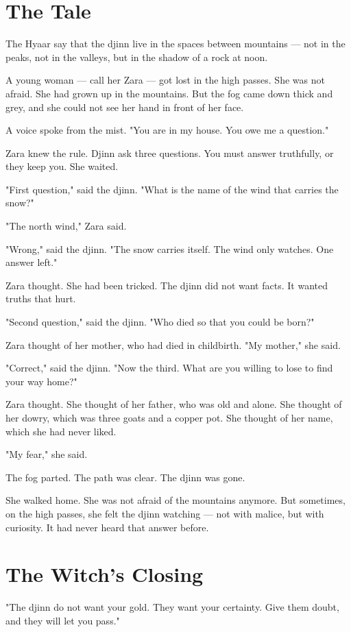 \documentclass[10pt,twoside]{book}
\begin{document}
\section*{The Tale}
The Hyaar say that the djinn live in the spaces between mountains --- not in the peaks, not in the valleys, but in the shadow of a rock at noon.

A young woman --- call her Zara --- got lost in the high passes. She was not afraid. She had grown up in the mountains. But the fog came down thick and grey, and she could not see her hand in front of her face.

A voice spoke from the mist. "You are in my house. You owe me a question."

Zara knew the rule. Djinn ask three questions. You must answer truthfully, or they keep you. She waited.

"First question," said the djinn. "What is the name of the wind that carries the snow?"

"The north wind," Zara said.

"Wrong," said the djinn. "The snow carries itself. The wind only watches. One answer left."

Zara thought. She had been tricked. The djinn did not want facts. It wanted truths that hurt.

"Second question," said the djinn. "Who died so that you could be born?"

Zara thought of her mother, who had died in childbirth. "My mother," she said.

"Correct," said the djinn. "Now the third. What are you willing to lose to find your way home?"

Zara thought. She thought of her father, who was old and alone. She thought of her dowry, which was three goats and a copper pot. She thought of her name, which she had never liked.

"My fear," she said.

The fog parted. The path was clear. The djinn was gone.

She walked home. She was not afraid of the mountains anymore. But sometimes, on the high passes, she felt the djinn watching --- not with malice, but with curiosity. It had never heard that answer before.

\section*{The Witch's Closing}
"The djinn do not want your gold. They want your certainty. Give them doubt, and they will let you pass."
\end{document}

